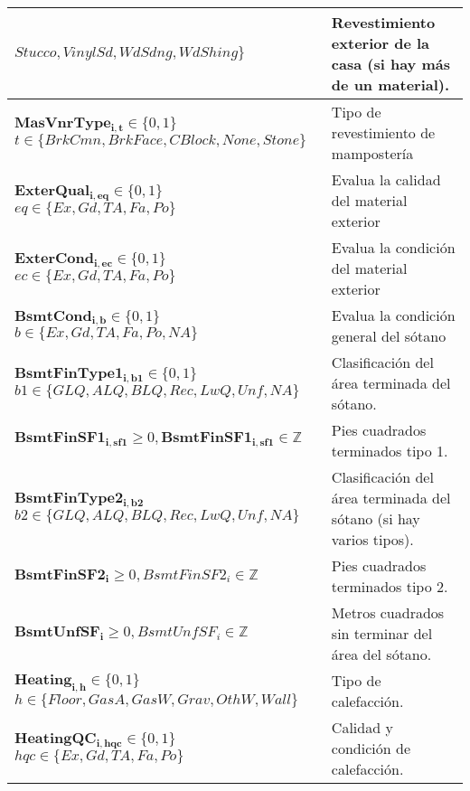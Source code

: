 \begin{longtable}{ | p{8cm} | p{5cm} | }
    \hspace{1cm}$Stucco, VinylSd, WdSdng, WdShing\}$ & Revestimiento exterior de la casa (si hay más de un material).\\
    \hline
    $\boldsymbol{MasVnrType_{i,t}} \in \{0, 1\}$\newline 
    $t \in \{BrkCmn, BrkFace, CBlock, None, Stone\}$ & Tipo de revestimiento de mampostería\\
    \hline
    $\boldsymbol{ExterQual_{i,eq}} \in \{0, 1\}$\newline 
    $eq \in \{Ex, Gd, TA, Fa, Po\}$ & Evalua la calidad del material exterior\\
    \hline
    $\boldsymbol{ExterCond_{i,ec}} \in \{0, 1\}$\newline 
    $ec \in \{Ex, Gd, TA, Fa, Po\}$ & Evalua la condición del material exterior\\
    \hline
    $\boldsymbol{BsmtCond_{i,b}} \in \{0, 1\}$\newline 
    $b \in \{Ex, Gd, TA, Fa, Po, NA\}$ & Evalua la condición general del sótano\\
    \hline
    $\boldsymbol{BsmtFinType1_{i, b1}} \in \{0, 1\}$ \newline $b1 \in \{GLQ, ALQ, BLQ, Rec, LwQ, Unf, NA\}$ & Clasificación del área terminada del sótano.\\
    \hline
    $\boldsymbol{BsmtFinSF1_{i, sf1}} \geq 0, \boldsymbol{BsmtFinSF1_{i, sf1}} \in \mathbb{Z}$ & Pies cuadrados terminados tipo 1.\\
    \hline
    $\boldsymbol{BsmtFinType2_{i,b2}}$\newline $b2 \in \{GLQ, ALQ, BLQ, Rec, LwQ, Unf, NA\}$ & Clasificación del área terminada del sótano (si hay varios tipos).\\
    \hline
    $\boldsymbol{BsmtFinSF2_{i}} \geq 0, BsmtFinSF2_{i} \in \mathbb{Z}$ & Pies cuadrados terminados tipo 2.\\
    \hline
    $\boldsymbol{BsmtUnfSF_{i}} \geq 0, BsmtUnfSF_{i} \in \mathbb{Z}$ & Metros cuadrados sin terminar del área del sótano.\\
    \hline
    $\boldsymbol{Heating_{i,h}} \in \{0, 1\}$\newline 
    $h \in \{Floor, GasA, GasW, Grav, OthW, Wall\}$ & Tipo de calefacción.\\
    \hline
    $\boldsymbol{HeatingQC_{i,hqc}} \in \{0, 1\}$\newline 
    $hqc \in \{Ex, Gd, TA, Fa, Po\}$ & Calidad y condición de calefacción.\\

\end{longtable}

